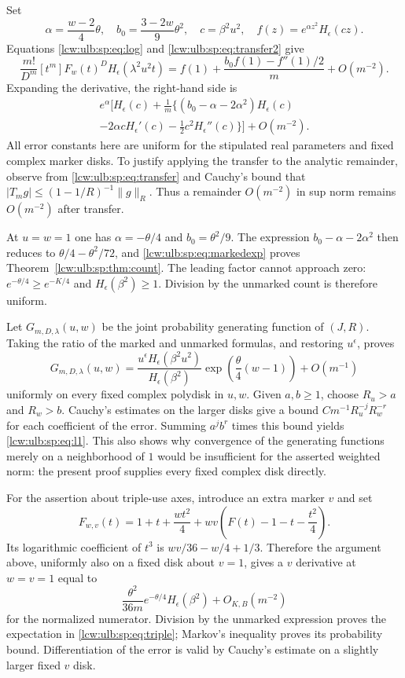 \documentclass[11pt,letterpaper]{article}
\theoremstyle{remark}\newtheorem{remark}[theorem]{Remark}
\begin{document}
Set
\[
 \alpha=\frac{w-2}{4}\theta,\quad
 b_0=\frac{3-2w}{9}\theta^2,\quad c=\beta^2u^2,\quad
 f(z)=e^{\alpha z^2}H_\epsilon(cz).
\]
Equations \eqref{lcw:ulb:sp:eq:log} and \eqref{lcw:ulb:sp:eq:transfer2} give
\begin{equation}\label{lcw:ulb:sp:eq:markedexp}
 \frac{m!}{D^m}[t^m]F_w(t)^D H_\epsilon(\lambda^2u^2t)
 =f(1)+\frac{b_0f(1)-f''(1)/2}{m}+O(m^{-2}).
\end{equation}
Expanding the derivative, the right-hand side is
\begin{multline*}
 e^\alpha\biggl[H_\epsilon(c)+\frac1m\bigl\{
 (b_0-\alpha-2\alpha^2)H_\epsilon(c)\\
 -2\alpha cH_\epsilon'(c)-\tfrac12c^2H_\epsilon''(c)
 \bigr\}\biggr]+O(m^{-2}).
\end{multline*}
All error constants here are uniform for the stipulated real parameters
and fixed complex marker disks. To justify applying the transfer to the
analytic remainder, observe from \eqref{lcw:ulb:sp:eq:transfer} and Cauchy's
bound that $|T_mg|\leq (1-1/R)^{-1}\|g\|_R$. Thus a remainder
$O(m^{-2})$ in sup norm remains $O(m^{-2})$ after transfer.

At $u=w=1$ one has $\alpha=-\theta/4$ and $b_0=\theta^2/9$.
The expression $b_0-\alpha-2\alpha^2$ then reduces to
$\theta/4-\theta^2/72$, and \eqref{lcw:ulb:sp:eq:markedexp} proves
Theorem~\ref{lcw:ulb:sp:thm:count}. The leading factor cannot approach zero:
$e^{-\theta/4}\geq e^{-K/4}$ and $H_\epsilon(\beta^2)\geq1$.
Division by the unmarked count is therefore uniform.

Let $G_{m,D,\lambda}(u,w)$ be the joint probability generating
function of $(J,R)$. Taking the ratio of the marked and unmarked
formulas, and restoring $u^\epsilon$, proves
\begin{equation}\label{lcw:ulb:sp:eq:pgf}
 G_{m,D,\lambda}(u,w)
 =\frac{u^\epsilon H_\epsilon(\beta^2u^2)}{H_\epsilon(\beta^2)}
     \exp\left(\frac\theta4(w-1)\right)+O(m^{-1})
\end{equation}
uniformly on every fixed complex polydisk in $u,w$.
Given $a,b\geq1$, choose $R_u>a$ and $R_w>b$. Cauchy's estimates
on the larger disks give a bound
$Cm^{-1}R_u^{-j}R_w^{-r}$ for each coefficient of the error.
Summing $a^jb^r$ times this bound yields
\eqref{lcw:ulb:sp:eq:l1}. This also shows why convergence of the generating
functions merely on a neighborhood of $1$ would be insufficient for
the asserted weighted norm: the present proof supplies every fixed
complex disk directly.

For the assertion about triple-use axes, introduce an extra marker
$v$ and set
\[
 F_{w,v}(t)=1+t+\frac{w t^2}{4}
          +wv\left(F(t)-1-t-\frac{t^2}{4}\right).
\]
Its logarithmic coefficient of $t^3$ is
$wv/36-w/4+1/3$. Therefore the argument above, uniformly also
on a fixed disk about $v=1$, gives a $v$ derivative at $w=v=1$
equal to
\[
 \frac{\theta^2}{36m}e^{-\theta/4}H_\epsilon(\beta^2)
 +O_{K,B}(m^{-2})
\]
for the normalized numerator. Division by the unmarked expression
proves the expectation in \eqref{lcw:ulb:sp:eq:triple}; Markov's inequality
proves its probability bound. Differentiation of the error is valid
by Cauchy's estimate on a slightly larger fixed $v$ disk.
\end{document}
